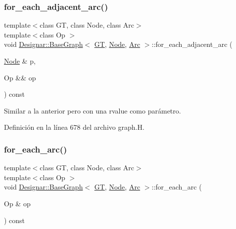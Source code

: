 \subsubsection{\texorpdfstring{for\+\_\+each\+\_\+adjacent\+\_\+arc()}{for\_each\_adjacent\_arc()}\hspace{0.1cm}{\footnotesize\ttfamily [2/2]}}
{\footnotesize\ttfamily template$<$class GT, class Node, class Arc$>$ \\
template$<$class Op $>$ \\
void \hyperlink{class_designar_1_1_base_graph}{Designar\+::\+Base\+Graph}$<$ \hyperlink{demo-buildgraph_8_c_a3001c40d2c31ca87ed96cd7d1334a55e}{GT}, \hyperlink{namespace_designar_a5af326c65aa2bd26b26c410f2030d09e}{Node}, \hyperlink{namespace_designar_a3f55fb5513d62ff47cbc8f72b8e95d6f}{Arc} $>$\+::for\+\_\+each\+\_\+adjacent\+\_\+arc (\begin{DoxyParamCaption}\item[{\hyperlink{namespace_designar_a5af326c65aa2bd26b26c410f2030d09e}{Node} \&}]{p,  }\item[{Op \&\&}]{op }\end{DoxyParamCaption}) const\hspace{0.3cm}{\ttfamily [inline]}}



Similar a la anterior pero con una rvalue como parámetro. 



Definición en la línea 678 del archivo graph.\+H.

\mbox{\label{class_designar_1_1_base_graph_ac46a1a7517a6c7029c6bae23d480cfa9}} 
\subsubsection{\texorpdfstring{for\+\_\+each\+\_\+arc()}{for\_each\_arc()}\hspace{0.1cm}{\footnotesize\ttfamily [1/2]}}
{\footnotesize\ttfamily template$<$class GT, class Node, class Arc$>$ \\
template$<$class Op $>$ \\
void \hyperlink{class_designar_1_1_base_graph}{Designar\+::\+Base\+Graph}$<$ \hyperlink{demo-buildgraph_8_c_a3001c40d2c31ca87ed96cd7d1334a55e}{GT}, \hyperlink{namespace_designar_a5af326c65aa2bd26b26c410f2030d09e}{Node}, \hyperlink{namespace_designar_a3f55fb5513d62ff47cbc8f72b8e95d6f}{Arc} $>$\+::for\+\_\+each\+\_\+arc (\begin{DoxyParamCaption}\item[{Op \&}]{op }\end{DoxyParamCaption}) const\hspace{0.3cm}{\ttfamily [inline]}}



